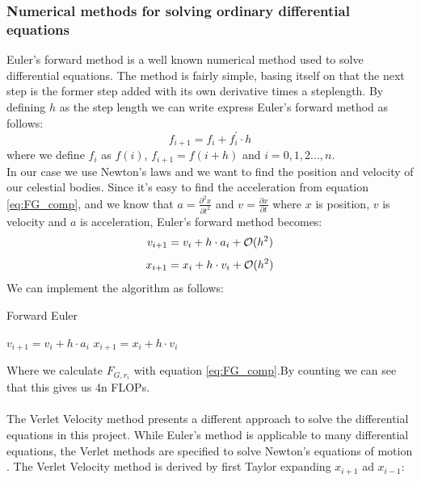 \documentclass{article}
\begin{document}
\subsubsection{Numerical methods for solving ordinary differential equations}
Euler's forward method \cite{Euler} is a well known numerical method used to solve differential equations. The method is fairly simple, basing itself on that the next step is the former step added with its own derivative times a steplength. By defining $h$ as the step length we can write express Euler's forward method as follows:
\begin{equation}
f_{i + 1} = f_i + f^{'}_i \cdot h
\label{eq:fwdEuler}
\end{equation}
where we define $f_i$ as $f(i)$, $f_{i+1} = f(i + h)$ and $i = 0, 1, 2 ... , n$. \\
In our case we use Newton's laws and we want to find the position and velocity of our celestial bodies. Since it's easy to find the acceleration from equation \eqref{eq:FG_comp}, and we know that $a = \frac{\partial^2 x}{\partial t^2}$ and $v = \frac{\partial x}{\partial t}$ where $x$ is position, $v$ is velocity and $a$ is acceleration, Euler's forward method becomes:
\begin{equation}
v_{i + 1} = v_i + h \cdot a_i + \mathcal{O}(h^2)\\
\label{eq:Eulervel}
\end{equation}
\begin{equation}
x_{i + 1} = x_i + h \cdot v_i + \mathcal{O}(h^2)\\
\label{eq:Eulerpos}
\end{equation}
We can implement the algorithm as follows:
\begin{algorithm}[H]
\small
\caption{Forward Euler}\label{alg:VelVerlet}
\begin{algorithmic}[1]
\State $v_{i+1} = v_i + h\cdot a_i $
\State $x_{i+1} = x_i + h\cdot v_i $
\EndFor
\end{algorithmic}
\end{algorithm}
Where we calculate $F_{G, r_i}$ with equation \eqref{eq:FG_comp}.By counting we can see that this gives us 4n FLOPs. \\ \\
The Verlet Velocity method presents a different approach to solve the differential equations in this project. While Euler's method is applicable to many differential equations, the Verlet methods are specified to solve Newton's equations of motion \cite{Newton}. The Verlet Velocity method is derived by first Taylor expanding $x_{i + 1}$ ad $x_{i-1}$:
\end{document}
